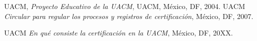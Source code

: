 \documentclass[12pt]{article}
\begin{document}
\begin{thebibliography}{20}
 \textsc{UACM},
\textit{Proyecto Educativo de la UACM},
UACM, M\'exico, DF, 2004.
 \textsc{UACM} 
\textit{Circular para regular los procesos y registros de certificaci\'on}, M\'exico, DF, 2007.

 \textsc{UACM} 
\textit{En qu\'e consiste la certificaci\'on en la UACM}, M\'exico, DF, 20XX.


\end{thebibliography}
\end{document}
